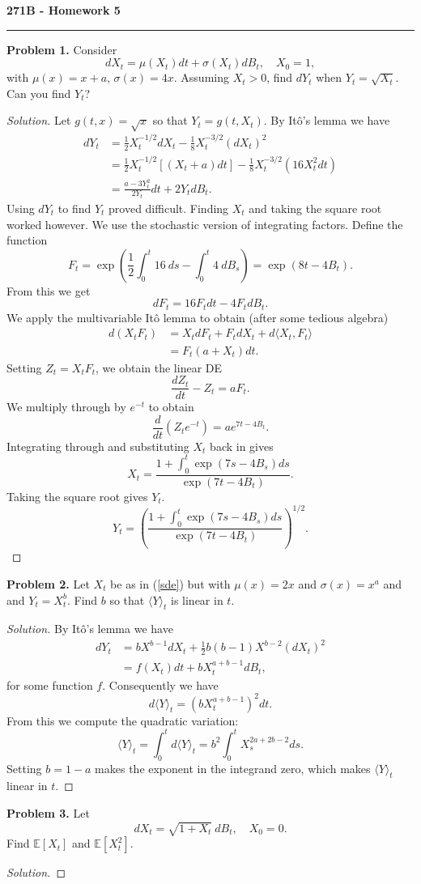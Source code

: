 \documentclass[11pt,letterpaper]{report}
\newcommand{\E}{\mathbb{E}}
\newenvironment{solution}
{\begin{proof}[Solution]}
{\end{proof}}
\begin{document}
\begin{center}
{\bf \Large 271B - Homework 5}
\vspace{0.2cm}
\hrule
\end{center}

\noindent\textbf{Problem 1. }
Consider
\begin{equation}\label{sde}
dX_t = \mu(X_t)dt + \sigma(X_t)dB_t,\quad X_0 = 1,
\end{equation}
with $\mu(x) = x+a$, $\sigma(x) = 4x$. Assuming $X_t > 0$, find $dY_t$ when $Y_t = \sqrt{X_t}$. Can you find $Y_t$?
\begin{solution}
	Let $g(t, x) = \sqrt{x}$ so that $Y_t = g(t, X_t)$. By It\^o's lemma we have
	\begin{align*}
		dY_t &= \frac{1}{2}X_t^{-1/2}dX_t - \frac{1}{8}X_{t}^{-3/2}(dX_t)^2\\
		&= \frac{1}{2}X_t^{-1/2}[(X_t+a)dt] - \frac{1}{8}X_t^{-3/2}(16X_t^2dt)\\
		&= \frac{a-3Y_t^2}{2Y_t}dt + 2Y_tdB_t.
	\end{align*}
	Using $dY_t$ to find $Y_t$ proved difficult. Finding $X_t$ and taking the square root worked however. We use the stochastic version of integrating factors. Define the function
	\[
	F_t = \exp\left(\frac{1}{2}\int_0^t16\ ds -\int_0^t4\ dB_s \right) = \exp(8t - 4B_t).
	\]
	From this we get
	\[
	dF_t = 16F_tdt - 4F_tdB_t.
	\]
	We apply the multivariable It\^o lemma to obtain (after some tedious algebra)
	\begin{align*}
	d(X_tF_t) &= X_tdF_t + F_tdX_t + d\langle X_t, F_t\rangle\\
	&= F_t(a+X_t)dt.
	\end{align*}
	Setting $Z_t = X_tF_t$, we obtain the linear DE
	\[
	\frac{dZ_t}{dt}-Z_t = aF_t.
	\]
	We multiply through by $e^{-t}$ to obtain
	\[
	\frac{d}{dt}(Z_te^{-t}) = ae^{7t-4B_t}.
	\]
	Integrating through and substituting $X_t$ back in gives
	\[
	X_t = \frac{1 + \int_0^t\exp(7s-4B_s)ds}{\exp(7t-4B_t)}.
	\]
	Taking the square root gives $Y_t$.
	\[
	Y_t = \left(\frac{1 + \int_0^t\exp(7s-4B_s)ds}{\exp(7t-4B_t)} \right)^{1/2}.
	\]
\end{solution}

\noindent\textbf{Problem 2. }
Let $X_t$ be as in (\ref{sde}) but with $\mu(x) = 2x$ and $\sigma(x) = x^a$ and and $Y_t = X_t^b$. Find $b$ so that $\langle Y\rangle_t$ is linear in $t$.
\begin{solution}
	By It\^o's lemma we have
	\begin{align*}
		dY_t &= bX^{b-1}dX_t + \frac{1}{2}b(b-1)X^{b-2}(dX_t)^2\\
		&= f(X_t)dt + bX_t^{a+b-1}dB_t,
	\end{align*}
	for some function $f$. Consequently we have
	\[
	d\langle Y\rangle_t = (bX_t^{a+b-1})^2dt.
	\]
	From this we compute the quadratic variation:
	\[
	\langle Y\rangle_t = \int_0^td\langle Y\rangle_t = b^2\int_0^tX_s^{2a+2b-2}ds.
	\]
	Setting $b = 1-a$ makes the exponent in the integrand zero, which makes $\langle Y\rangle_t$ linear in $t$.
\end{solution}

\noindent\textbf{Problem 3. }
Let
\[
dX_t = \sqrt{1+X_t}\ dB_t,\quad X_0 = 0.
\]
Find $\E[X_t]$ and $\E[X_t^2]$.
\begin{solution}
	
\end{solution}
\end{document}

